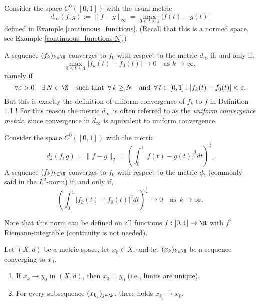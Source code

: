 \np

\begin{example}
Consider the space $C^0([0,1])$ with the usual metric
\[
d_\infty(f,g):= \|f-g\|_{\infty} = \max_{0 \le t \le 1} |f(t) - g(t)|
\]
defined in Example \ref{continuous_functions}. (Recall that this is a normed space, see Example \ref{continuous_functions-N}.)

A sequence $(f_k)_{k \in \N}$ converges to $f_0$ with respect to the metric $d_\infty$ if, and only if,
$$
\max_{0 \le t \le 1} |f_k(t) - f_0(t)| \to 0 \quad \textrm{as } k\to \infty,
$$
namely if
\[
\forall \varepsilon > 0 \quad \exists \,N \in \N \quad\textrm{such that } \, \forall \, k \ge N \quad \textrm{and } \, \forall \, t \in [0,1] : |f_k(t) - f_0(t)| < \varepsilon.
\]
But this is exactly the definition of uniform convergence of $f_k$ to $f$ in 
Definition 1.1%
! For this reason the metric $d_\infty$ is often referred to as the \textit{uniform convergence metric}, since convergence in $d_\infty$ is equivalent to uniform convergence.
\end{example}

\begin{example}
Consider the space $C^0([0,1])$ with the metric
\[
d_2(f,g) = \|f-g\|_{2} = \left(\int_0^1 |f(t) - g(t)|^2 dt\right)^\frac12.
\]
A sequence $(f_k)_{k \in \N}$ converges to $f_0$ with respect to the metric $d_2$ (commonly said in the $L^2$-norm) if, and only if,
\[
\left(\int_0^1 |f_k(t) - f_0(t)|^2 dt\right)^\frac12 \to 0 \quad \textrm{as } \, k\to \infty.
\]
\smallskip

Note that this norm can be defined on all functions $f: [0,1] \to \R$ with $f^2$ Riemann-integrable (continuity is not needed).

\end{example}

\np

\begin{theorem} \label{thm:uniqueness}
Let  $(X,d)$ be a metric space, let $x_0\in X$, and let $(x_k)_{k \in \N}$ be a sequence converging to $x_0$.
\begin{enumerate}
\item \label{item2.1.1.i} If $x_k \to y_0$ in $(X,d)$, then $x_0 = y_0$ (i.e., limits are unique).
\item \label{item2.1.1.iii} For every subsequence $(x_{k_j})_{j \in \N}$, there holds
$x_{k_j} \to x_0$.
\end{enumerate}
\end{theorem}

